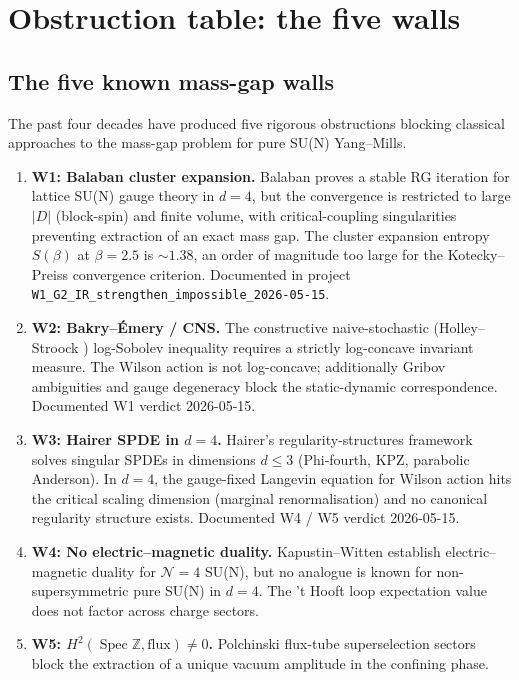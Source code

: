 \documentclass[11pt]{amsart}
\theoremstyle{definition}
\theoremstyle{remark}
\DeclareMathOperator{\Spec}{Spec}
\newcommand{\Z}{\mathbb{Z}}
\begin{document}
\section{Obstruction table: the five walls}\label{sec:obstructions}

\subsection{The five known mass-gap walls}\label{ss:walls-recap}

The past four decades have produced five rigorous obstructions blocking
classical approaches to the mass-gap problem for pure SU(N) Yang--Mills.

\begin{enumerate}
\item \textbf{W1: Balaban cluster expansion.} Balaban
\cite{Balaban1987} proves a stable RG iteration for lattice
SU(N) gauge theory in $d = 4$, but the convergence is
restricted to large $|D|$ (block-spin) and finite volume, with
critical-coupling singularities preventing extraction of an exact mass
gap. The cluster expansion entropy $S(\beta)$ at $\beta = 2.5$ is
$\sim 1.38$, an order of magnitude too large for the Kotecky--Preiss
\cite{KoteckyPreiss1986} convergence criterion. Documented in
project \texttt{W1\_G2\_IR\_strengthen\_impossible\_2026-05-15}.

\item \textbf{W2: Bakry--\'Emery / CNS.} The constructive
naive-stochastic (Holley--Stroock \cite{HolleyStroock1989})
log-Sobolev inequality requires a strictly log-concave invariant
measure. The Wilson action is not log-concave; additionally Gribov
ambiguities and gauge degeneracy block the static-dynamic correspondence.
Documented W1 verdict 2026-05-15.

\item \textbf{W3: Hairer SPDE in $d = 4$.} Hairer's regularity-structures
framework \cite{Hairer2014} solves singular SPDEs in dimensions $d \le 3$
(Phi-fourth, KPZ, parabolic Anderson). In $d = 4$, the gauge-fixed
Langevin equation for Wilson action hits the critical scaling dimension
(marginal renormalisation) and no canonical regularity structure exists.
Documented W4 / W5 verdict 2026-05-15.

\item \textbf{W4: No electric--magnetic duality.} Kapustin--Witten
\cite{KapustinWitten2007} establish electric--magnetic duality for
$\mathcal{N} = 4$ SU(N), but no analogue is known for non-supersymmetric
pure SU(N) in $d = 4$. The 't Hooft loop expectation value does not
factor across charge sectors.

\item \textbf{W5: $H^2(\Spec \Z, \mathrm{flux}) \neq 0$.} Polchinski
\cite{Polchinski1996} flux-tube superselection sectors block the
extraction of a unique vacuum amplitude in the confining phase.
\end{enumerate}
\end{document}

